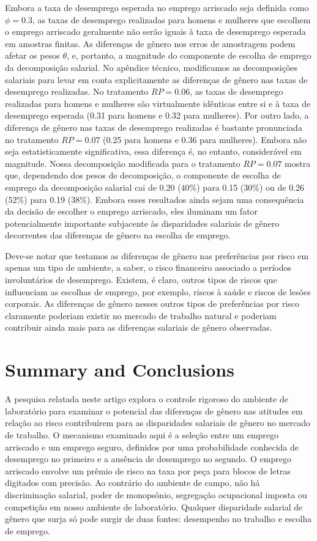 \documentclass[a4paper,12pt]{article}[abntex2]
\begin{document}
Embora a taxa de desemprego esperada no emprego arriscado seja definida como \( \phi = 0.3 \), as taxas de desemprego realizadas para homens e mulheres que escolhem o emprego arriscado geralmente não serão iguais à taxa de desemprego esperada em amostras finitas. As diferenças de gênero nos erros de amostragem podem afetar os pesos \( \theta \), e, portanto, a magnitude do componente de escolha de emprego da decomposição salarial. No apêndice técnico, modificamos as decomposições salariais para levar em conta explicitamente as diferenças de gênero nas taxas de desemprego realizadas. No tratamento \( RP = 0.06 \), as taxas de desemprego realizadas para homens e mulheres são virtualmente idênticas entre si e à taxa de desemprego esperada (0.31 para homens e 0.32 para mulheres). Por outro lado, a diferença de gênero nas taxas de desemprego realizadas é bastante pronunciada no tratamento \( RP = 0.07 \) (0.25 para homens e 0.36 para mulheres). Embora não seja estatisticamente significativa, essa diferença é, no entanto, considerável em magnitude. Nossa decomposição modificada para o tratamento \( RP = 0.07 \) mostra que, dependendo dos pesos de decomposição, o componente de escolha de emprego da decomposição salarial cai de 0.20 (40\%) para 0.15 (30\%) ou de 0.26 (52\%) para 0.19 (38\%). Embora esses resultados ainda sejam uma consequência da decisão de escolher o emprego arriscado, eles iluminam um fator potencialmente importante subjacente às disparidades salariais de gênero decorrentes das diferenças de gênero na escolha de emprego.

Deve-se notar que testamos as diferenças de gênero nas preferências por risco em apenas um tipo de ambiente, a saber, o risco financeiro associado a períodos involuntários de desemprego. Existem, é claro, outros tipos de riscos que influenciam as escolhas de emprego, por exemplo, riscos à saúde e riscos de lesões corporais. As diferenças de gênero nesses outros tipos de preferências por risco claramente poderiam existir no mercado de trabalho natural e poderiam contribuir ainda mais para as diferenças salariais de gênero observadas.


\section{\textbf{Summary and Conclusions}}

A pesquisa relatada neste artigo explora o controle rigoroso do ambiente de laboratório para examinar o potencial das diferenças de gênero nas atitudes em relação ao risco contribuírem para as disparidades salariais de gênero no mercado de trabalho. O mecanismo examinado aqui é a seleção entre um emprego arriscado e um emprego seguro, definidos por uma probabilidade conhecida de desemprego no primeiro e a ausência de desemprego no segundo. O emprego arriscado envolve um prêmio de risco na taxa por peça para blocos de letras digitados com precisão. Ao contrário do ambiente de campo, não há discriminação salarial, poder de monopsônio, segregação ocupacional imposta ou competição em nosso ambiente de laboratório. Qualquer disparidade salarial de gênero que surja só pode surgir de duas fontes: desempenho no trabalho e escolha de emprego.
\end{document}
